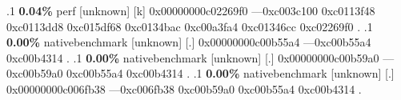 \begin{profile}
{.1 \textbf{ 0.04\%} perf             [unknown]              [k] 0x00000000c02269f0\newline {} ---0xc003c100\newline {} 0xc0113f48\newline {} 0xc0113dd8\newline {} 0xc015df68\newline {} 0xc0134bac\newline {} 0xc00a3fa4\newline {} 0xc01346cc\newline {} 0xc02269f0\newline {} . 
.1 \textbf{ 0.00\%} nativebenchmark  [unknown]              [.] 0x00000000c00b55a4\newline {} ---0xc00b55a4\newline {} 0xc00b4314\newline {} . 
.1 \textbf{ 0.00\%} nativebenchmark  [unknown]              [.] 0x00000000c00b59a0\newline {} ---0xc00b59a0\newline {} 0xc00b55a4\newline {} 0xc00b4314\newline {} . 
.1 \textbf{ 0.00\%} nativebenchmark  [unknown]              [.] 0x00000000c006fb38\newline {} ---0xc006fb38\newline {} 0xc00b59a0\newline {} 0xc00b55a4\newline {} 0xc00b4314\newline {} . 
}
\end{profile}
